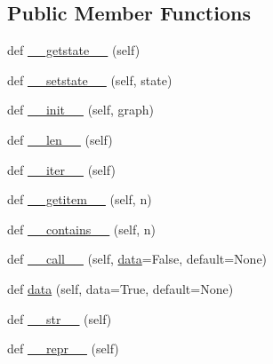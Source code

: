 \subsection*{Public Member Functions}
\begin{DoxyCompactItemize}
\item 
def \hyperlink{classnetworkx_1_1classes_1_1reportviews_1_1NodeView_a287345459b79b2a68cce55abf32388a4}{\+\_\+\+\_\+getstate\+\_\+\+\_\+} (self)
\item 
def \hyperlink{classnetworkx_1_1classes_1_1reportviews_1_1NodeView_abd17954268e8ec932e6a1dd40641756c}{\+\_\+\+\_\+setstate\+\_\+\+\_\+} (self, state)
\item 
def \hyperlink{classnetworkx_1_1classes_1_1reportviews_1_1NodeView_a68e9b918ecfff9cf8dbf23668ba569e0}{\+\_\+\+\_\+init\+\_\+\+\_\+} (self, graph)
\item 
def \hyperlink{classnetworkx_1_1classes_1_1reportviews_1_1NodeView_ab31158b961b3ba4f2f3b005e722f4565}{\+\_\+\+\_\+len\+\_\+\+\_\+} (self)
\item 
def \hyperlink{classnetworkx_1_1classes_1_1reportviews_1_1NodeView_a32503ac31a2d391c396b24780d17a607}{\+\_\+\+\_\+iter\+\_\+\+\_\+} (self)
\item 
def \hyperlink{classnetworkx_1_1classes_1_1reportviews_1_1NodeView_ae0aaff92dc2d3c9b106229ef44395c4e}{\+\_\+\+\_\+getitem\+\_\+\+\_\+} (self, n)
\item 
def \hyperlink{classnetworkx_1_1classes_1_1reportviews_1_1NodeView_a4b82fda9482c56e5afd156cc95889f3b}{\+\_\+\+\_\+contains\+\_\+\+\_\+} (self, n)
\item 
def \hyperlink{classnetworkx_1_1classes_1_1reportviews_1_1NodeView_a9f5dd7241f234085954da09fdc07cf86}{\+\_\+\+\_\+call\+\_\+\+\_\+} (self, \hyperlink{classnetworkx_1_1classes_1_1reportviews_1_1NodeView_a45c43a9585be0507c729655928ecf581}{data}=False, default=None)
\item 
def \hyperlink{classnetworkx_1_1classes_1_1reportviews_1_1NodeView_a45c43a9585be0507c729655928ecf581}{data} (self, data=True, default=None)
\item 
def \hyperlink{classnetworkx_1_1classes_1_1reportviews_1_1NodeView_a7b0b68b913f9b503839761c506e1f192}{\+\_\+\+\_\+str\+\_\+\+\_\+} (self)
\item 
def \hyperlink{classnetworkx_1_1classes_1_1reportviews_1_1NodeView_ab5d70dcc96a37e6fe8129114877ad663}{\+\_\+\+\_\+repr\+\_\+\+\_\+} (self)
\end{DoxyCompactItemize}


